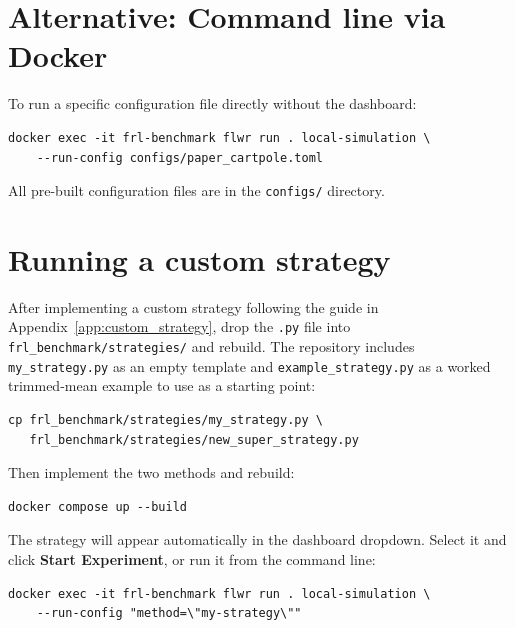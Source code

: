 \documentclass[a4paper, oneside]{discothesis}
\begin{document}
\section*{Alternative: Command line via Docker}

To run a specific configuration file directly without the dashboard:

\begin{verbatim}
docker exec -it frl-benchmark flwr run . local-simulation \
    --run-config configs/paper_cartpole.toml
\end{verbatim}

All pre-built configuration files are in the \texttt{configs/} directory.

\section*{Running a custom strategy}

After implementing a custom strategy following the guide in Appendix~\ref{app:custom_strategy}, drop the \texttt{.py} file into \texttt{frl\_benchmark/strategies/} and rebuild. The repository includes \texttt{my\_strategy.py} as an empty template and \texttt{example\_strategy.py} as a worked trimmed-mean example to use as a starting point:

\begin{verbatim}
cp frl_benchmark/strategies/my_strategy.py \
   frl_benchmark/strategies/new_super_strategy.py
\end{verbatim}

Then implement the two methods and rebuild:

\begin{verbatim}
docker compose up --build
\end{verbatim}

The strategy will appear automatically in the dashboard dropdown. Select it and click \textbf{Start Experiment}, or run it from the command line:

\begin{verbatim}
docker exec -it frl-benchmark flwr run . local-simulation \
    --run-config "method=\"my-strategy\""
\end{verbatim}
\end{document}
